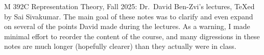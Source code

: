 \documentclass[11pt,leqno]{article}
\theoremstyle{plain}
\theoremstyle{definition}
\numberwithin{equation}{section}
\numberwithin{lem}{section}
\begin{document}
M 392C Representation Theory, Fall 2025: Dr.~David Ben-Zvi's lectures, \TeX ed by Sai Sivakumar. The main goal of these notes was to clarify and even expand on several of the points David made during the lectures. As a warning, I made minimal effort to reorder the content of the course, and many digressions in these notes are much longer (hopefully clearer) than they actually were in class.
\tableofcontents








% 
% 
% 
% 
% 
% 
% 
% 
% 
% 
% 
% 
% 
% 
% 
% 
% 
% 
% 
% 
% 
% 
% 
% 
% 
% 
% 
% 
% 
% 
% 
% 
% 
% 
% 
% 
% 


% 

\end{document}
